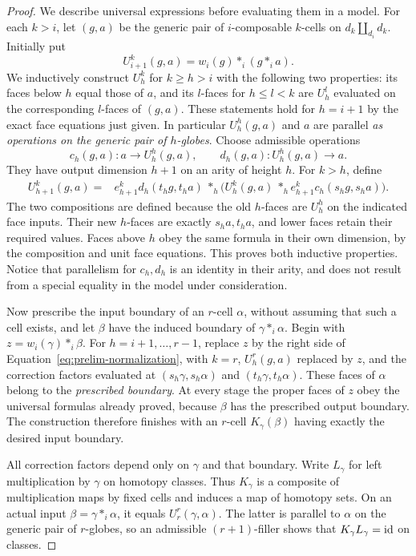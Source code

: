 \begin{proof}
We describe universal expressions before evaluating them in a model.
For each $k>i$, let $(g,a)$ be the generic pair of $i$-composable
$k$-cells on $d_k\amalg_{d_i}d_k$.  Initially put
\[
 U_{i+1}^k(g,a)=w_i(g)*_i(g*_i a).
\]
We inductively construct $U_h^k$ for $k\ge h>i$ with the following
two properties: its faces below $h$ equal those of $a$, and its
$l$-faces for $h\le l<k$ are $U_h^l$ evaluated on the corresponding
$l$-faces of $(g,a)$.  These statements hold for $h=i+1$ by the
exact face equations just given.  In particular $U_h^h(g,a)$ and
$a$ are parallel \emph{as operations on the generic pair of
$h$-globes}.  Choose admissible operations
\[
 c_h(g,a):a\longrightarrow U_h^h(g,a),\qquad
 d_h(g,a):U_h^h(g,a)\longrightarrow a.
\]
They have output dimension $h+1$ on an arity of height $h$.
For $k>h$, define
\begin{equation}\label{eq:prelim-normalization}
 \begin{split}
 U_{h+1}^k(g,a)={}&
 e_{h+1}^k d_h(t_hg,t_ha)\ *_h\bigl(
 U_h^k(g,a)\ *_h e_{h+1}^k c_h(s_hg,s_ha)\bigr).
 \end{split}
\end{equation}
The two compositions are defined because the old $h$-faces are
$U_h^h$ on the indicated face inputs.  Their new $h$-faces are
exactly $s_ha,t_ha$, and lower faces retain their required values.
Faces above $h$ obey the same formula in their own dimension,
by the composition and unit face equations.  This proves both
inductive properties.  Notice that parallelism for $c_h,d_h$ is
an identity in their arity, and does not result from a special
equality in the model under consideration.

Now prescribe the input boundary of an $r$-cell $\alpha$, without
assuming that such a cell exists, and let $\beta$ have the induced
boundary of $\gamma*_i\alpha$.  Begin with
$z=w_i(\gamma)*_i\beta$.  For $h=i+1,\ldots,r-1$, replace $z$ by
the right side of Equation~\eqref{eq:prelim-normalization}, with
$k=r$, $U_h^r(g,a)$ replaced by $z$, and the correction factors
evaluated at $(s_h\gamma,s_h\alpha)$ and
$(t_h\gamma,t_h\alpha)$.  These faces of $\alpha$ belong to the
\emph{prescribed boundary}.  At every stage the proper faces of
$z$ obey the universal formulas already proved, because
$\beta$ has the prescribed output boundary.  The construction
therefore finishes with an $r$-cell $K_\gamma(\beta)$ having
exactly the desired input boundary.

All correction factors depend only on $\gamma$ and that boundary.
Write $L_\gamma$ for left multiplication by $\gamma$ on homotopy classes.
Thus $K_\gamma$ is a composite of multiplication maps by fixed
cells and induces a map of homotopy sets.  On an actual input
$\beta=\gamma*_i\alpha$, it equals $U_r^r(\gamma,\alpha)$.
The latter is parallel to $\alpha$ on the generic pair of
$r$-globes, so an admissible $(r+1)$-filler shows that
$K_\gamma L_\gamma=\mathrm{id}$ on classes.


\end{proof}
